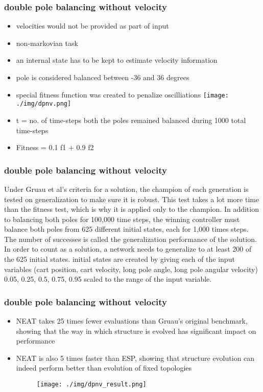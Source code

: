 \documentclass{beamer}
\begin{document}
\begin{frame}
\frametitle{double pole balancing without velocity}
\begin{itemize}
  \item velocities would not be provided as part of input
  \item non-markovian task
  \item an internal state has to be kept to estimate velocity information
  \item pole is considered balanced between -36 and 36 degrees
  \item special fitness function was created to penalize oscilliations
  \texttt{[image: ./img/dpnv.png]}  
  \item t = no. of time-steps both the poles remained balanced during 1000 total time-steps
  \item Fitness = 0.1 f1 + 0.9 f2
\end{itemize}
\end{frame}

\begin{frame}
\frametitle{double pole balancing without velocity}
Under Gruau et al's criteria for a solution, the champion of each generation is tested on generalization to make sure it is robust. This test takes a lot more time than the fitness test, which is why it is applied only to the champion. In addition to balancing both poles for 100,000 time steps, the winning controller must balance both poles from 625 different initial states, each for 1,000 times steps. The number of successes is called the generalization performance of the solution. In order to count as a solution, a network needs to generalize to at least 200 of the 625 initial states.
\bigbreak
initial states are created by giving each of the input variables (cart position, cart velocity, long pole angle, long pole angular velocity) 0.05, 0.25, 0.5, 0.75, 0.95 scaled to the range of the input variable.
\end{frame}

\begin{frame}
\frametitle{double pole balancing without velocity}
\begin{itemize}
 \item NEAT takes 25 times fewer evaluations than Gruau’s original benchmark, showing that the way in which structure is evolved has significant impact on performance
 \item NEAT is also 5 times faster than ESP, showing that structure evolution can indeed perform better than evolution of fixed topologies
 \begin{figure}
 \texttt{[image: ./img/dpnv\_result.png]} 
 \end{figure}
\end{itemize}
\end{frame}
\end{document}
